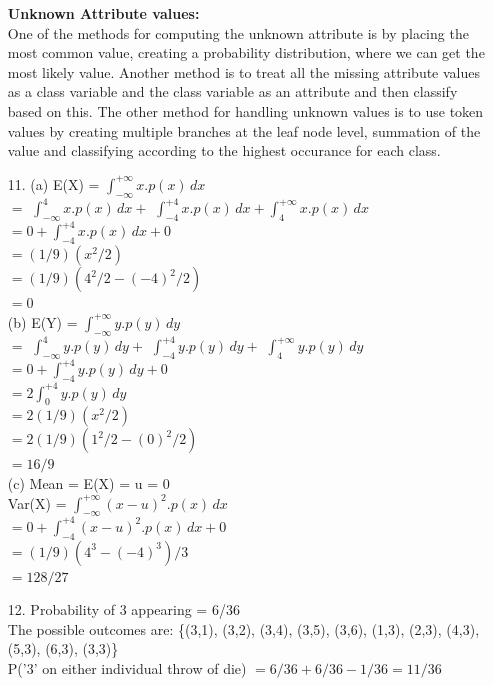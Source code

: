 \documentclass[12pt]{article}
\begin{document}
\begin{enumerate}
\textbf{Unknown Attribute values:} \\

One of the methods for computing the unknown attribute is by placing the most common value, creating a probability distribution, where we can get the most likely value. Another method is to treat all the missing attribute values as a class variable and the class variable as an attribute and then classify based on this. The other method for handling unknown values is to use token values by creating multiple branches at the leaf node level, summation of the value and classifying according to the highest occurance for each class.\\

\item[11.] (a) E(X) = $ \int^{+\infty}_{-\infty} x.p(x) \, dx $ \\
$=$ $ \int^{4}_{-\infty} x.p(x) \, dx + $
$ \int^{+4}_{-4} x.p(x) \, dx +  \int^{+\infty}_{4} x.p(x) \, dx $ \\
$ = 0 +  \int^{+4}_{-4} x.p(x) \, dx + 0 $ \\
$= (1/9)(x^2/2)$ \\
$= (1/9)(4^2/2-(-4)^2/2)$ \\
$= 0$ \\

(b) E(Y) = $ \int^{+\infty}_{-\infty} y.p(y) \, dy $ \\
$=$ $ \int^{4}_{-\infty} y.p(y) \, dy + $ $\int^{+4}_{-4} y.p(y) \, dy +$ $ \int^{+\infty}_{4} y.p(y) \, dy $ \\
$ = 0 +  \int^{+4}_{-4} y.p(y) \, dy + 0 $ \\
$ = 2\int^{+4}_{0} y.p(y) \, dy $ \\
$= 2(1/9)(x^2/2)$ \\
$= 2(1/9)(1^2/2-(0)^2/2)$ \\
$= 16/9$ \\

(c) Mean = E(X) = u = 0 \\
Var(X) = $ \int^{+\infty}_{-\infty} (x-u)^2.p(x) \, dx $ \\
$ = 0 +  \int^{+4}_{-4} (x-u)^2.p(x) \, dx + 0 $ \\
$= (1/9)(4^3-(-4)^3)/3$ \\
$= 128/27$ \\

\item[12.] Probability of 3 appearing = 6/36 \\
The possible outcomes are: \{(3,1), (3,2), (3,4), (3,5), (3,6), (1,3), (2,3), (4,3), (5,3), (6,3), (3,3)\} \\
P('3' on either individual throw of die) $= 6/36 + 6/36 - 1/36 = 11/36$ \\


\end{enumerate}
\end{document}
